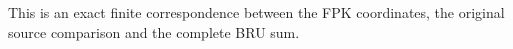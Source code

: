 This is an exact finite correspondence between the FPK coordinates,
the original source comparison and the complete BRU sum.